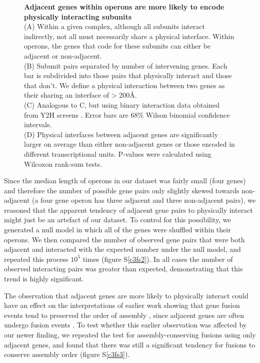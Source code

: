 \documentclass[a4paper,11pt,twoside,openright]{scrbook}
\begin{document}
\begin{figure}[h]
    \caption[Adjacent genes within operons are more likely to encode physically interacting subunits]{\sffamily \textbf{Adjacent genes within operons are more likely to encode physically interacting subunits} \\ \small (A) Within a given complex, although all subunits interact indirectly, not all must necessarily share a physical interface. Within operons, the genes that code for these subunits can either be adjacent or non-adjacent.\\
    (B) Subunit pairs separated by number of intervening genes. Each bar is subdivided into those pairs that physically interact and those that don't. We define a physical interaction between two genes as their sharing an interface of > 200Å.\\
    (C) Analogous to C, but using binary interaction data obtained from Y2H screens \cite{Rajagopala2014}. Error bars are 68\% Wilson binomial confidence intervals.\\
    (D) Physical interfaces between adjacent genes are significantly larger on average than either non-adjacent genes or those encoded in different transcriptional units. P-values were calculated using Wilcoxon rank-sum tests.}
    \label{c3f2}
\end{figure}

Since the median length of operons in our dataset was fairly small (four genes) and therefore the number of possible gene pairs only slightly skewed towards non-adjacent (a four gene operon has three adjacent and three non-adjacent pairs), we reasoned that the apparent tendency of adjacent gene pairs to physically interact might just be an artefact of our dataset. To control for this possibility, we generated a null model in which all of the genes were shuffled within their operons. We then compared the number of observed gene pairs that were both adjacent and interacted with the expected number under the null model, and repeated this process \(10^{5}\) times (figure S\ref{c3fs2}). In all cases the number of observed interacting pairs was greater than expected, demonstrating that this trend is highly significant.

The observation that adjacent genes are more likely to physically interact could have an effect on the interpretations of earlier work showing that gene fusion events tend to preserved the order of assembly \cite{Marsh2013}, since adjacent genes are often undergo fusion events \cite{Pasek2006}. To test whether this earlier observation was affected by our newer finding, we repeated the test for assembly-conserving fusions using only adjacent genes, and found that there was still a significant tendency for fusions to conserve assembly order (figure S\ref{c3fs3}).
\end{document}

